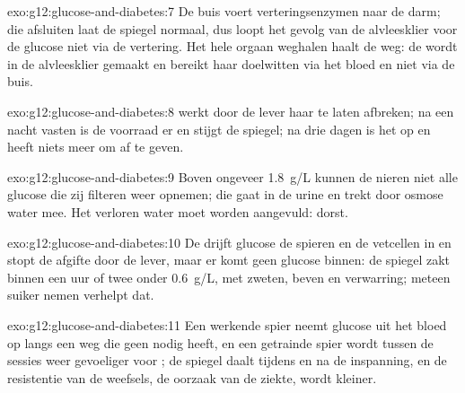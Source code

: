 \begin{solution}{exo:g12:glucose-and-diabetes:7}
De buis voert verteringsenzymen naar de darm; die afsluiten laat de
spiegel normaal, dus loopt het gevolg van de alvleesklier voor de glucose
niet via de vertering. Het hele orgaan weghalen haalt de  weg: de
 wordt in de alvleesklier gemaakt en bereikt haar doelwitten via
het bloed en niet via de buis.
\end{solution}

\begin{solution}{exo:g12:glucose-and-diabetes:8}
 werkt door de lever haar  te laten afbreken; na een
nacht vasten is de voorraad er en stijgt de spiegel; na drie dagen is het
 op en heeft  niets meer om af te geven.
\end{solution}

\begin{solution}{exo:g12:glucose-and-diabetes:9}
Boven ongeveer \qty{1.8}{g/L} kunnen de nieren niet alle glucose die zij
filteren weer opnemen; die gaat in de urine en trekt door osmose water
mee. Het verloren water moet worden aangevuld: dorst.
\end{solution}

\begin{solution}{exo:g12:glucose-and-diabetes:10}
De  drijft glucose de spieren en de vetcellen in en stopt de
afgifte door de lever, maar er komt geen glucose binnen: de spiegel zakt
binnen een uur of twee onder \qty{0.6}{g/L}, met zweten, beven en
verwarring; meteen suiker nemen verhelpt dat.
\end{solution}

\begin{solution}{exo:g12:glucose-and-diabetes:11}
Een werkende spier neemt glucose uit het bloed op langs een weg die geen
 nodig heeft, en een getrainde spier wordt tussen de sessies weer
gevoeliger voor ; de spiegel daalt tijdens en na de inspanning, en
de resistentie van de weefsels, de oorzaak van de ziekte, wordt kleiner.
\end{solution}

